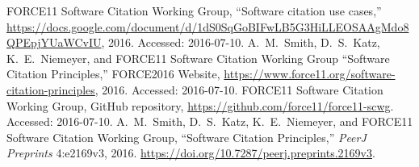 \documentclass[conference]{IEEEtran}
\begin{document}
%
%
%
\begin{thebibliography}{1}

FORCE11 Software Citation Working Group, ``Software citation use cases,'' \url{https://docs.google.com/document/d/1dS0SqGoBIFwLB5G3HiLLEOSAAgMdo8QPEpjYUaWCvIU}, 2016. Accessed: 2016-07-10.
A.~M.~Smith, D.~S.~Katz, K.~E.~Niemeyer, and FORCE11 Software Citation Working Group ``Software Citation Principles,'' FORCE2016 Website, \url{https://www.force11.org/software-citation-principles}, 2016. Accessed: 2016-07-10.
FORCE11 Software Citation Working Group, GitHub repository, \url{https://github.com/force11/force11-scwg}.  Accessed: 2016-07-10.
A.~M.~Smith, D.~S.~Katz, K.~E.~Niemeyer, and FORCE11 Software Citation Working Group, ``Software Citation Principles,'' \textit{PeerJ Preprints} 4:e2169v3, 2016. \url{https://doi.org/10.7287/peerj.preprints.2169v3}.


\end{thebibliography}




\end{document}
